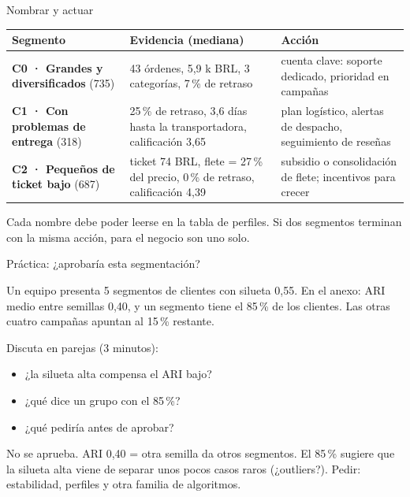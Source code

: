 \documentclass[aspectratio=169,12pt]{beamer}
\newcommand{\hrow}{\rowcolor{mlcream}}
\begin{document}
\begin{frame}{Nombrar y actuar}
  \centering\footnotesize
  \begin{tabular}{@{}L{0.22\textwidth} L{0.36\textwidth} L{0.32\textwidth}@{}}
    \toprule
    \hrow \textbf{Segmento} & \textbf{Evidencia (mediana)} & \textbf{Acción} \\
    \midrule
    \textbf{C0 · Grandes y diversificados} (735) & 43 órdenes, 5,9 k BRL, 3 categorías, 7\,\% de retraso & cuenta clave: soporte dedicado, prioridad en campañas \\
    \textbf{C1 · Con problemas de entrega} (318) & 25\,\% de retraso, 3,6 días hasta la transportadora, calificación 3,65 & plan logístico, alertas de despacho, seguimiento de reseñas \\
    \textbf{C2 · Pequeños de ticket bajo} (687) & ticket 74 BRL, flete = 27\,\% del precio, 0\,\% de retraso, calificación 4,39 & subsidio o consolidación de flete; incentivos para crecer \\
    \bottomrule
  \end{tabular}
  \raggedright
  \begin{keybox}
    \small Cada nombre debe poder leerse en la tabla de perfiles. Si dos segmentos terminan con la misma acción, para el negocio son uno solo.
  \end{keybox}
\end{frame}

\begin{frame}{Práctica: ¿aprobaría esta segmentación?}
  \begin{taskbox}[Situación]
    \small Un equipo presenta 5 segmentos de clientes con silueta 0,55. En el anexo: ARI medio entre semillas 0,40, y un segmento tiene el 85\,\% de los clientes. Las otras cuatro campañas apuntan al 15\,\% restante.
  \end{taskbox}
  \small Discuta en parejas (3 minutos):
  \begin{itemize}
    \item ¿la silueta alta compensa el ARI bajo?
    \item ¿qué dice un grupo con el 85\,\%?
    \item ¿qué pediría antes de aprobar?
  \end{itemize}
  \begin{keybox}
    \small No se aprueba. ARI 0,40 = otra semilla da otros segmentos. El 85\,\% sugiere que la silueta alta viene de separar unos pocos casos raros (¿outliers?). Pedir: estabilidad, perfiles y otra familia de algoritmos.
  \end{keybox}
\end{frame}
\end{document}

